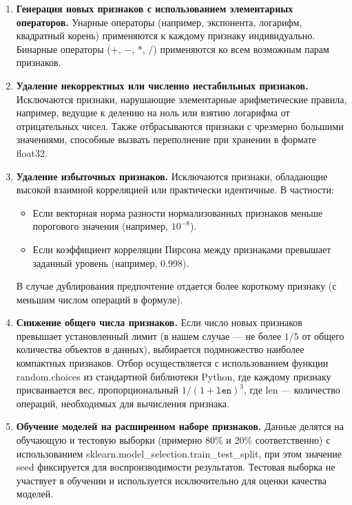 \documentclass[a4paper,12pt]{article}
\begin{document}
    \begin{enumerate}
      \item \textbf{Генерация новых признаков с использованием элементарных операторов.}
      Унарные операторы (например, экспонента, логарифм, квадратный корень) применяются к каждому признаку индивидуально. Бинарные операторы ($+$, $-$, $*$, $/$) применяются ко всем возможным парам признаков.
      
      \item \textbf{Удаление некорректных или численно нестабильных признаков.}
      Исключаются признаки, нарушающие элементарные арифметические правила, например, ведущие к делению на ноль или взятию логарифма от отрицательных чисел. Также отбрасываются признаки с чрезмерно большими значениями, способные вызвать переполнение при хранении в формате float32.
      
      \item \textbf{Удаление избыточных признаков.}
      Исключаются признаки, обладающие высокой взаимной корреляцией или практически идентичные. В частности:
      \begin{itemize}
      \item Если векторная норма разности нормализованных признаков меньше порогового значения (например, $10^{-8}$).
      \item Если коэффициент корреляции Пирсона между признаками превышает заданный уровень (например, 0.998).
      \end{itemize}
      В случае дублирования предпочтение отдается более короткому признаку (с меньшим числом операций в формуле).
      
      \item \textbf{Снижение общего числа признаков.}
      Если число новых признаков превышает установленный лимит (в нашем случае --- не более $1/5$ от общего количества объектов в данных), выбирается подмножество наиболее компактных признаков.
      Отбор осуществляется с использованием функции random.choices из стандартной библиотеки Python, где каждому признаку присваивается вес, пропорциональный $1/(1 + \texttt{len})^3$, где len --- количество операций, необходимых для вычисления признака.
      
      \item \textbf{Обучение моделей на расширенном наборе признаков.}
      Данные делятся на обучающую и тестовую выборки (примерно 80\% и 20\% соответственно) с использованием sklearn.model\_selection.train\_test\_split, при этом значение seed фиксируется для воспроизводимости результатов. Тестовая выборка не участвует в обучении и используется исключительно для оценки качества моделей.
      

\end{enumerate}
\end{document}
